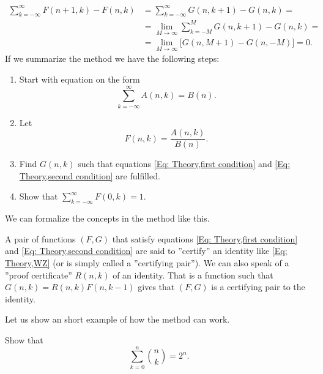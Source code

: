 \begin{equation*}
\begin{split}
\sum_{k=-\infty}^\infty F(n+1,k)-F(n,k) & = \sum_{k=-\infty}^\infty G(n,k+1)-G(n,k) = \\
 & = \lim_{M\to\infty} \sum_{k=-M}^M G(n,k+1)-G(n,k) = \\
 & = \lim_{M\to\infty} \big[G(n,M+1)-G(n,-M)\big] = 0.
\end{split}
\end{equation*}
If we summarize the method we have the following steps:
\begin{enumerate}
  \item Start with equation on the form $$\sum_{k=-\infty}^\infty A(n,k) = B(n).$$
  \item Let $$F(n,k)=\frac{A(n,k)}{B(n)}.$$
  \item Find $G(n,k)$ such that equations \ref{Eq: Theory,first condition} and \ref{Eq: Theory,second condition} are fulfilled.
  \item Show that $\sum_{k=-\infty}^\infty F(0,k)=1$.
\end{enumerate}
We can formalize the concepts in the method like this.
\begin{definition}
  A pair of functions $(F,G)$ that satisfy equations \ref{Eq: Theory,first condition} and \ref{Eq: Theory,second condition} are said to ''certify'' an identity like \ref{Eq: Theory,WZ} (or is simply called a ''certifying pair''). We can also speak of a ''proof certificate'' $R(n,k)$ of an identity. That is a function such that $G(n,k)=R(n,k)F(n,k-1)$ gives that $(F,G)$ is a certifying pair to the identity.
\end{definition}
Let us show an short example of how the method can work.
\begin{example}
  Show that $$\sum_{k=0}^n \binom{n}{k} = 2^n.$$
\end{example}
